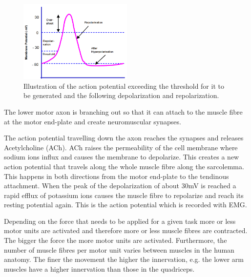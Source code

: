 \begin{figure}[H]
	\includegraphics[width=0.5\textwidth]{figures/Anatomy/action_potential}  %
	\caption{Illustration of the action potential exceeding the threshold for it to be generated and the following depolarization and repolarization. \cite{konrad2005}}
	\label{fig:action_potential}  %
\end{figure}

The lower motor axon is branching out so that it can attach to the muscle fibre at the motor end-plate and create neuromuscular synapses. 

The action potential travelling down the axon reaches the synapses and releases Acetylcholine (ACh). ACh raises the permeability of the cell membrane where sodium ions influx and causes the membrane to depolarize. 
This creates a new action potential that travels along the whole muscle fibre along the sarcolemma.
This happens in both directions from the motor end-plate to the tendinous attachment. When the peak of the depolarization of about 30mV is reached a rapid efflux of potassium ions causes the muscle fibre to repolarize and reach its resting potential again. This is the action potential which is recorded with EMG. \cite{cram2012}

Depending on the force that needs to be applied for a given task more or less motor units are activated and therefore more or less muscle fibres are contracted. The bigger the force the more motor units are activated. Furthermore, the number of muscle fibres per motor unit varies between muscles in the human anatomy. The finer the movement the higher the innervation, e.g. the lower arm muscles have a higher innervation than those in the quadriceps. \cite{cram2012}

